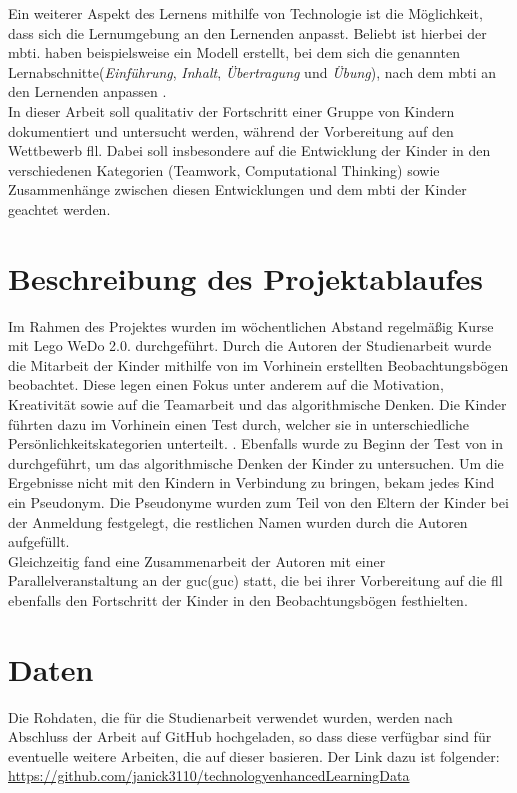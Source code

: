 Ein weiterer Aspekt des Lernens mithilfe von Technologie ist die Möglichkeit, dass sich die Lernumgebung an den Lernenden anpasst. Beliebt ist hierbei der \acrlong{mbti}. \citeauthor{yel_adaptive_2018} haben beispielsweise ein Modell erstellt, bei dem sich die genannten Lernabschnitte(\textit{Einführung}, \textit{Inhalt}, \textit{Übertragung} und \textit{Übung}), nach dem \acrshort{mbti} an den Lernenden anpassen \cite{yel_adaptive_2018}.\\
In dieser Arbeit soll qualitativ der Fortschritt einer Gruppe von Kindern dokumentiert und untersucht werden, während der Vorbereitung auf den Wettbewerb \acrlong{fll}. Dabei soll insbesondere auf die Entwicklung der Kinder in den verschiedenen Kategorien (Teamwork, Computational Thinking) sowie Zusammenhänge zwischen diesen Entwicklungen und dem \acrshort{mbti} der Kinder geachtet werden.



\section{Beschreibung des Projektablaufes}
Im Rahmen des Projektes wurden im wöchentlichen Abstand regelmäßig Kurse mit Lego WeDo 2.0. durchgeführt. Durch die Autoren der Studienarbeit wurde die Mitarbeit der Kinder mithilfe von im Vorhinein erstellten Beobachtungsbögen beobachtet. Diese legen einen Fokus unter anderem auf die Motivation, Kreativität sowie auf die Teamarbeit und das algorithmische Denken. Die Kinder führten dazu im Vorhinein einen Test durch, welcher sie in unterschiedliche Persönlichkeitskategorien unterteilt. \cite{knowAndLove}. Ebenfalls wurde zu Beginn der Test von \citeauthor{zapata_bctt_2021} in  durchgeführt, um das algorithmische Denken der Kinder zu untersuchen.
Um die Ergebnisse nicht mit den Kindern in Verbindung zu bringen, bekam jedes Kind ein Pseudonym. Die Pseudonyme wurden zum Teil von den Eltern der Kinder bei der Anmeldung festgelegt, die restlichen Namen wurden durch die Autoren aufgefüllt.\\
Gleichzeitig fand eine Zusammenarbeit der Autoren mit einer Parallelveranstaltung an der \acrlong{guc}(\acrshort{guc}) statt, die bei ihrer Vorbereitung auf die \acrshort{fll} ebenfalls den Fortschritt der Kinder in den Beobachtungsbögen festhielten.


\section{Daten}
Die Rohdaten, die für die Studienarbeit verwendet wurden, werden nach Abschluss der Arbeit auf GitHub hochgeladen, so dass diese verfügbar sind für eventuelle weitere Arbeiten, die auf dieser basieren. Der Link dazu ist folgender: \url{https://github.com/janick3110/technologyenhancedLearningData}
